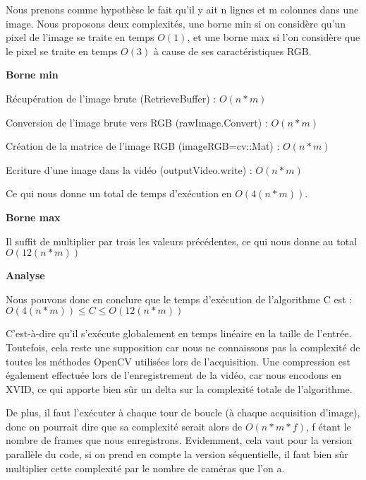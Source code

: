 Nous prenons comme hypothèse le fait qu'il y ait n lignes et m colonnes dans une image. Nous proposons deux complexités, une borne min si on considère qu'un pixel de l'image se traite en temps $O(1)$, et une borne max si l'on considère que le pixel se traite en temps $O(3)$ à cause de ses caractéristiques RGB.

\textbf{Borne min}

Récupération de l'image brute (RetrieveBuffer) : $O(n*m)$

Conversion de l'image brute vers RGB (rawImage.Convert) : $O(n*m)$

Création de la matrice de l'image RGB (imageRGB=cv::Mat) : $O(n*m)$

Ecriture d'une image dans la vidéo (outputVideo.write) : $O(n*m)$

Ce qui nous donne un total de temps d'exécution en $O(4(n*m))$.

\textbf{Borne max}

Il suffit de multiplier par trois les valeurs précédentes, ce qui nous donne au total $O(12(n*m))$

\textbf{Analyse}

Nous pouvons donc en conclure que le temps d'exécution de l'algorithme C est :
$O(4(n*m)) \leq C \leq O(12(n*m))$

C'est-à-dire qu'il s'exécute globalement en temps linéaire en la taille de l'entrée. Toutefois, cela reste une supposition car nous ne connaissons pas la complexité de toutes les méthodes OpenCV utilisées lors de l'acquisition. Une compression est également effectuée lors de l'enregistrement de la vidéo, car nous encodons en XVID, ce qui apporte bien sûr un delta sur la complexité totale de l'algorithme.

De plus, il faut l'exécuter à chaque tour de boucle (à chaque acquisition d'image), donc on pourrait dire que sa complexité serait alors de $O(n*m*f)$, f étant le nombre de frames que nous enregistrons. Evidemment, cela vaut pour la version parallèle du code, si on prend en compte la version séquentielle, il faut bien sûr multiplier cette complexité par le nombre de caméras que l'on a.
